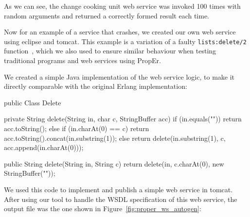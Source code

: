 \documentclass[submission,copyright]{eptcs}
\begin{document}
As we can see, the change cooking unit web service was invoked 100
times with random arguments and returned a correctly formed result
each time.

Now for an example of a service that crashes, we created our own web
service using eclipse and tomcat. This example is a variation of a
faulty \texttt{lists:delete/2} function~\cite{PropErTypes@Erlang-11},
which we also used to ensure similar behaviour when testing
traditional programs and web services using PropEr.

We created a simple Java implementation of the web service logic, to
make it directly comparable with the original Erlang implementation:
\begin{lstjava}
public Class Delete {
    private String delete(String in, char c, StringBuffer acc) {
        if (in.equals("")) {
            return acc.toString();
        }
        else if (in.charAt(0) == c) {
            return acc.toString().concat(in.substring(1));
        }
        else {
            return delete(in.substring(1), c, acc.append(in.charAt(0)));
        }
    }
    
    public String delete(String in, String c) {
        return delete(in, c.charAt(0), new StringBuffer(""));
    } 
}
\end{lstjava}

We used this code to implement and publish a simple web service in
tomcat. After using our tool to handle the WSDL specification of this
web service, the output file was the one shown in
Figure~\ref{fig:proper_ws_autogen}:
\end{document}
